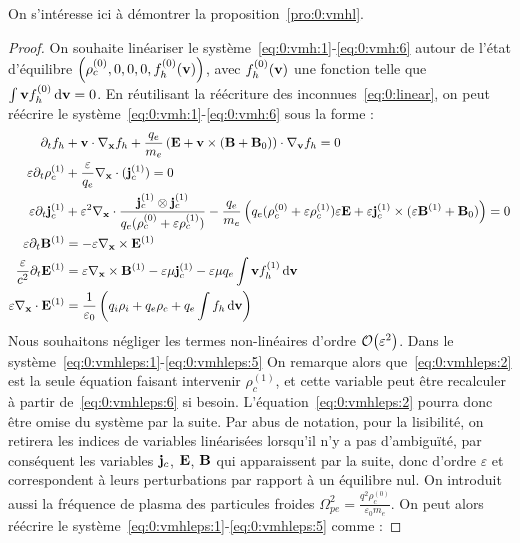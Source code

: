On s'intéresse ici à démontrer la proposition~\ref{pro:0:vmhl}.
\begin{proof}
  On souhaite linéariser le système~\eqref{eq:0:vmh:1}-\eqref{eq:0:vmh:6} autour de l'état d'équilibre $\left(\rho_c^{(0)},0,0,0,f_h^{(0)}(\vb{v})\right)$, avec $f_h^{(0)}(\vb{v})$ une fonction telle que $\int\vb{v}f_h^{(0)}\dd{\vb{v}} = 0$. En réutilisant la réécriture des inconnues~\eqref{eq:0:linear}, on peut réécrire le système~\eqref{eq:0:vmh:1}-\eqref{eq:0:vmh:6} sous la forme :
  \begin{align}
    \label{eq:0:vmhleps:1}
      \partial_t f_h &+ \vb{v}\cdot\nabla_{\vb{x}} f_h + \frac{q_e}{m_e}\left( \vb{E} + \vb{v}\times(\vb{B}+\vb{B}_0) \right)\cdot\nabla_{\vb{v}} f_h = 0 \\
    \label{eq:0:vmhleps:2}
      \varepsilon\partial_t\rho_c^{(1)} &+ \frac{\varepsilon}{q_e}\nabla_{\vb{x}}\cdot(\vb{j}_c^{(1)}) = 0 \\
    \label{eq:0:vmhleps:3}
      \varepsilon\partial_t\vb{j}_c^{(1)} &+ \varepsilon^2\nabla_{\vb{x}}\cdot\frac{\vb{j}_c^{(1)}\otimes\vb{j}_c^{(1)}}{q_e(\rho_c^{(0)}+\varepsilon\rho_c^{(1)})} - \frac{q_e}{m_e}\left( q_e(\rho_c^{(0)}+\varepsilon\rho_c^{(1)})\varepsilon\vb{E} + \varepsilon\vb{j}_c^{(1)}\times(\varepsilon\vb{B}^{(1)}+\vb{B}_0) \right) = 0 \\
    \label{eq:0:vmhleps:4}
      \varepsilon\partial_t\vb{B}^{(1)} &= - \varepsilon\nabla_{\vb{x}}\times\vb{E}^{(1)} \\
    \label{eq:0:vmhleps:5}
      \frac{\varepsilon}{c^2}\partial_t\vb{E}^{(1)} &= \varepsilon\nabla_{\vb{x}}\times \vb{B}^{(1)} - \varepsilon\mu\vb{j}_c^{(1)} - \varepsilon\mu q_e\int \vb{v} f_h^{(1)}\dd{\vb{v}} \\
    \label{eq:0:vmhleps:6}
      \varepsilon\nabla_{\vb{x}}\cdot\vb{E}^{(1)} &= \frac{1}{\varepsilon_0}\left( q_i\rho_i + q_e\rho_c + q_e\int f_h\dd{\vb{v}} \right)
  \end{align}
  Nous souhaitons négliger les termes non-linéaires d'ordre $\order{\varepsilon^2}$. Dans le système~\eqref{eq:0:vmhleps:1}-\eqref{eq:0:vmhleps:5} On remarque alors que~\eqref{eq:0:vmhleps:2} est la seule équation faisant intervenir $\rho_c^{(1)}$, et cette variable peut être recalculer à partir de~\eqref{eq:0:vmhleps:6} si besoin. L'équation~\eqref{eq:0:vmhleps:2} pourra donc être omise du système par la suite. Par abus de notation, pour la lisibilité, on retirera les indices de variables linéarisées lorsqu'il n'y a pas d'ambiguïté, par conséquent les variables $\vb{j}_c$, $\vb{E}$, $\vb{B}$ qui apparaissent par la suite, donc d'ordre $\varepsilon$ et correspondent à leurs perturbations par rapport à un équilibre nul. On introduit aussi la fréquence de plasma des particules froides $\Omega_{pe}^2 = \frac{q^2\rho_c^{(0)}}{\varepsilon_0m_e}$. On peut alors réécrire le système~\eqref{eq:0:vmhleps:1}-\eqref{eq:0:vmhleps:5} comme :

\end{proof}
